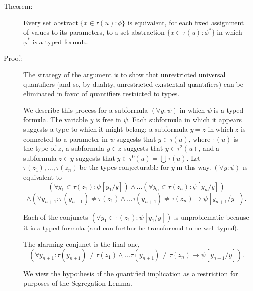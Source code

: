 \documentclass[12pt]{article}
\begin{document}
\begin{description}
\item[Theorem:]  Every set abstract $\{x \in \tau(u):\phi\}$ is equivalent, for each fixed assignment of values to its parameters, to a set abstraction \newline $\{x \in \tau(u):\phi^*\}$ in which $\phi^*$ is a typed formula.

\item[Proof:]  The strategy of the argument is to show that unrestricted universal quantifiers (and so, by duality, unrestricted existential quantifiers) can be eliminated in favor of quantifiers restricted to types.

We describe this process for a subformula $(\forall y:\psi)$ in which $\psi$ is a typed formula.  The variable $y$ is free in $\psi$.  Each subformula in which it appears suggests a type to which it might belong:  a subformula $y = z$ in which $z$ is connected to a parameter in $\psi$ suggests that
$y \in \tau(u)$, where $\tau(u)$ is the type of $z$, a subformula $y \in z$ suggests that $y \in \tau^2(u)$, and a subformula $z \in y$ suggests that $y \in \tau^0(u) = \bigcup \tau(u)$.  Let $\tau(z_1),\ldots,\tau(z_n)$ be the types conjecturable for $y$ in this way.  $(\forall y:\psi)$ is equivalent to $$(\forall y_1 \in \tau(z_1):\psi[y_1/y]) \wedge \ldots (\forall y_n \in \tau(z_n):\psi[y_n/y]) $$ $$\wedge (\forall y_{n+1}:\tau(y_{n+1}) \neq \tau(z_1) \wedge \ldots \tau(y_{n+1}) \neq \tau(z_n) \rightarrow \psi[y_{n+1}/y]).$$

Each of the conjuncts $(\forall y_1 \in \tau(z_1):\psi[y_1/y])$ is unproblematic because it is a typed formula (and can further be transformed to be well-typed).

The alarming conjunct is the final one, $$(\forall y_{n+1}:\tau(y_{n+1}) \neq \tau(z_1) \wedge \ldots \tau(y_{n+1}) \neq \tau(z_n) \rightarrow \psi[y_{n+1}/y]).$$

We view the hypothesis of the quantified implication as a restriction for purposes of the Segregation Lemma.


\end{description}
\end{document}
